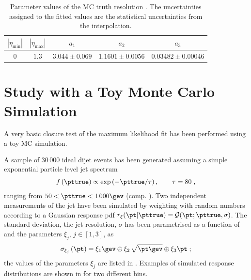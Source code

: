 \begin{table}[ht]
  \caption{Parameter values of the MC truth resolution .
    The uncertainties assigned to the fitted values are the
    statistical uncertainties from the interpolation.}
  \centering
  \begin{tabular}[ht]{ccccc}
    \toprule
    $|\eta_{\text{min}}|$ & $|\eta_{\text{max}}|$ & $a_{1}$ & $a_{2}$ & $a_{3}$ \\
    \midrule
    $0$ & $1.3$ & $3.044 \pm 0.069$ & $1.1601 \pm 0.0056$ & $0.03482 \pm 0.00046$ \\
   \bottomrule
  \end{tabular}
  \label{tab:ResFit:MCTruthReso}
\end{table}



\section{Study with a Toy Monte Carlo Simulation}\label{sec:ResFit:App:ToyMC}

A very basic closure test of the maximum likelihood fit has been performed using a toy MC simulation.

A sample of $30\,000$ ideal dijet events has been generated assuming a simple exponential particle level jet \pt spectrum
\begin{equation}
  \label{eq:ResFit:ToyMC:Spectrum}
  f\left(\pttrue\right) \propto \exp\left(-\pttrue / \tau\right),
  \qquad \tau = 80 \;,
\end{equation}
ranging from \mbox{$50 < \pttrue < 1\,000\gev$} (comp. ).
Two independent measurements of the jet \pt have been simulated by weighting \pttrue with random numbers according to a Gaussian response pdf \mbox{$r_{\mathbf{\xi}}(\pt|\pttrue) = \mathcal{G}(\pt;\pttrue,\sigma)$}.
The standard deviation, \ie the jet resolution, $\sigma$ has been parametrised as a function of \pttrue and the parameters $\xi_{j}$, \mbox{$j\in [1,3]$}, as
\begin{equation}
  \label{eq:ResFit:ToyMC:Sigma}
  \sigma_{\xi_{j}}\left(\pt\right) = \xi_{1}\gev \oplus \xi_{2}\,\sqrt{\pt\gev}\oplus \xi_{3}\pt \;;
\end{equation}
the values of the parameters $\xi_{j}$ are listed in .
Examples of simulated response distributions are shown in  for two different \pttrue bins.

